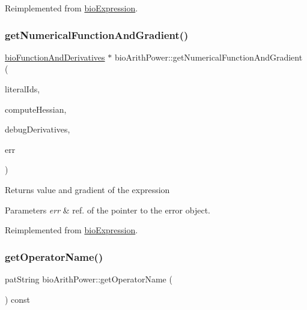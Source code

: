 Reimplemented from \hyperlink{classbio_expression_a3e4b4dca58dbbc6f0e411b30eb3f60b4}{bio\+Expression}.

\mbox{\label{classbio_arith_power_a21f939e2e8554c6ae153be6bdc873b1a}} 
\subsubsection{\texorpdfstring{get\+Numerical\+Function\+And\+Gradient()}{getNumericalFunctionAndGradient()}}
{\footnotesize\ttfamily \hyperlink{classbio_function_and_derivatives}{bio\+Function\+And\+Derivatives} $\ast$ bio\+Arith\+Power\+::get\+Numerical\+Function\+And\+Gradient (\begin{DoxyParamCaption}\item[{vector$<$ pat\+U\+Long $>$}]{literal\+Ids,  }\item[{pat\+Boolean}]{compute\+Hessian,  }\item[{pat\+Boolean}]{debug\+Derivatives,  }\item[{pat\+Error $\ast$\&}]{err }\end{DoxyParamCaption})\hspace{0.3cm}{\ttfamily [virtual]}}

\begin{DoxyReturn}{Returns}
value and gradient of the expression 
\end{DoxyReturn}

\begin{DoxyParams}{Parameters}
{\em err} & ref. of the pointer to the error object. \\
\hline
\end{DoxyParams}


Reimplemented from \hyperlink{classbio_expression_a91c81ce80c9e972c913b10f5f3c1ed13}{bio\+Expression}.

\mbox{\label{classbio_arith_power_a7edb8072b2c5aef093244305fbc76962}} 
\subsubsection{\texorpdfstring{get\+Operator\+Name()}{getOperatorName()}}
{\footnotesize\ttfamily pat\+String bio\+Arith\+Power\+::get\+Operator\+Name (\begin{DoxyParamCaption}{ }\end{DoxyParamCaption}) const\hspace{0.3cm}{\ttfamily [virtual]}}

